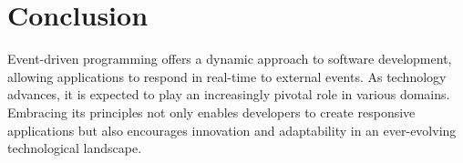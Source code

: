 \documentclass[twocolumn]{article}
\begin{document}
\section{Conclusion}
\label{sec:conclusion}

Event-driven programming offers a dynamic approach to software development, allowing applications to respond in real-time to external events.
As technology advances, it is expected to play an increasingly pivotal role in various domains.
Embracing its principles not only enables developers to create responsive applications but also encourages innovation and adaptability in an ever-evolving technological landscape.



\end{document}
